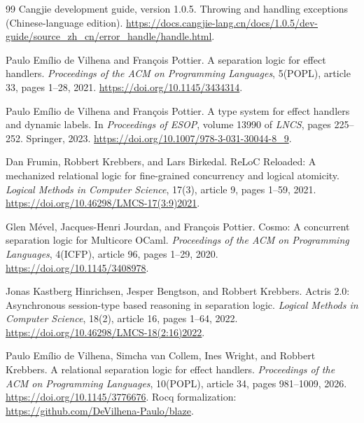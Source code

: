\documentclass[11pt]{article}
\begin{document}
\begin{thebibliography}{99}
Cangjie development guide, version 1.0.5.
Throwing and handling exceptions (Chinese-language edition).
\url{https://docs.cangjie-lang.cn/docs/1.0.5/dev-guide/source_zh_cn/error_handle/handle.html}.

Paulo Em\'ilio de Vilhena and Fran\c{c}ois Pottier.
A separation logic for effect handlers.
\emph{Proceedings of the ACM on Programming Languages}, 5(POPL), article 33, pages 1--28, 2021.
\url{https://doi.org/10.1145/3434314}.

Paulo Em\'ilio de Vilhena and Fran\c{c}ois Pottier.
A type system for effect handlers and dynamic labels.
In \emph{Proceedings of ESOP}, volume 13990 of \emph{LNCS}, pages 225--252. Springer, 2023.
\url{https://doi.org/10.1007/978-3-031-30044-8_9}.

Dan Frumin, Robbert Krebbers, and Lars Birkedal.
ReLoC Reloaded: A mechanized relational logic for fine-grained concurrency and logical atomicity.
\emph{Logical Methods in Computer Science}, 17(3), article 9, pages 1--59, 2021.
\url{https://doi.org/10.46298/LMCS-17(3:9)2021}.

Glen M\'evel, Jacques-Henri Jourdan, and Fran\c{c}ois Pottier.
Cosmo: A concurrent separation logic for Multicore OCaml.
\emph{Proceedings of the ACM on Programming Languages}, 4(ICFP), article 96, pages 1--29, 2020.
\url{https://doi.org/10.1145/3408978}.

Jonas Kastberg Hinrichsen, Jesper Bengtson, and Robbert Krebbers.
Actris 2.0: Asynchronous session-type based reasoning in separation logic.
\emph{Logical Methods in Computer Science}, 18(2), article 16, pages 1--64, 2022.
\url{https://doi.org/10.46298/LMCS-18(2:16)2022}.

Paulo Em\'ilio de Vilhena, Simcha van Collem, Ines Wright, and Robbert Krebbers.
A relational separation logic for effect handlers.
\emph{Proceedings of the ACM on Programming Languages}, 10(POPL), article 34, pages 981--1009, 2026.
\url{https://doi.org/10.1145/3776676}.
Rocq formalization: \url{https://github.com/DeVilhena-Paulo/blaze}.

\end{thebibliography}
\end{document}
